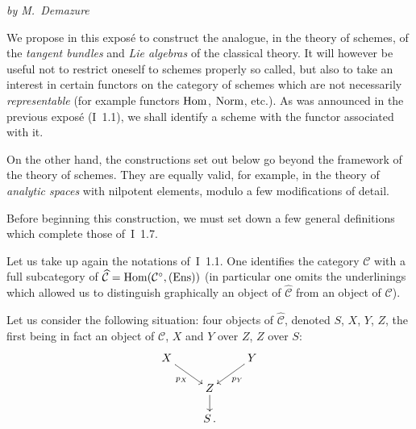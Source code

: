 \label{II}

\begin{center}
\textit{by M.~Demazure}
\end{center}

{\renewcommand{\thefootnote}{(0)}}%
We propose in this expos\'e to construct the analogue, in the theory of
schemes, of the \emph{tangent bundles} and \emph{Lie algebras} of the
classical theory. It will however be useful not to restrict oneself to
schemes properly so called, but also to take an interest in certain functors
on the category of schemes which are not necessarily \emph{representable}
(for example functors \(\operatorname{Hom}\), \(\operatorname{Norm}\), etc.). As was announced in the
previous expos\'e (\cf I~1.1), we shall identify a scheme with the functor
associated with it.

On the other hand, the constructions set out below go beyond the framework
of the theory of schemes. They are equally valid, for example, in the theory
of \emph{analytic spaces} with nilpotent elements, modulo a few modifications
of detail.

Before beginning this construction, we must set down a few general
definitions which complete those of~I~1.7.

\label{II.sec.1}

Let us take up again the notations of~I~1.1. One identifies the category
\(\mathcal{C}\) with a full subcategory of
\(\widehat{\mathcal{C}}=\operatorname{Hom}(\mathcal{C}^{\circ},\textup{(Ens)})\) (in particular one
omits the underlinings%
{\renewcommand{\thefootnote}{(1)}}
which allowed us to distinguish graphically an object of
\(\widehat{\mathcal{C}}\) from an object of \(\mathcal{C}\)).

Let us consider the following situation: four objects of
\(\widehat{\mathcal{C}}\), denoted \(S\), \(X\), \(Y\), \(Z\), the first
being in fact an object of \(\mathcal{C}\), \(X\) and \(Y\) over \(Z\), \(Z\)
over \(S\):
\[
\xymatrix@C=2.2em@R=1.4em{
X \ar[dr]_{p_X} & & Y \ar[dl]^{p_Y} \\
& Z \ar[d] & \\
& S\,. &
}
\]

